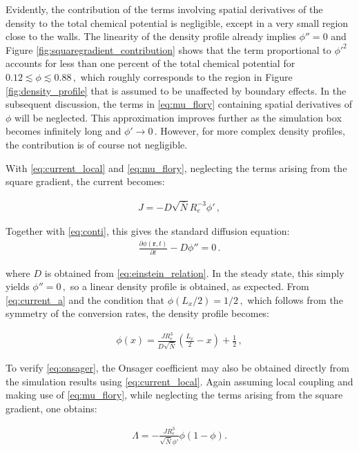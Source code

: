 \documentclass[bachelor,       %
               twoside,        %
               BCOR10mm,       %
               ngerman, english %
               ]{GAUBM}
\begin{document}
Evidently, the contribution of the terms involving spatial derivatives of the density to the total chemical potential is negligible, except in a very small region close to the walls. The linearity of the density profile already implies $\phi''=0$ and Figure \ref{fig:squaregradient_contribution} shows that the term proportional to $\phi'^2$ accounts for less than one percent of the total chemical potential for $0.12\lesssim\phi\lesssim 0.88\,,$ which roughly corresponds to the region in Figure \ref{fig:density_profile} that is assumed to be unaffected by boundary effects. In the subsequent discussion, the terms in \eqref{eq:mu_flory} containing spatial derivatives of $\phi$ will be neglected. This approximation improves further as the simulation box becomes infinitely long and $\phi'\rightarrow 0\,.$ However, for more complex density profiles, the contribution is of course not negligible.

With \eqref{eq:current_local} and \eqref{eq:mu_flory}, neglecting the terms arising from the square gradient, the current becomes:


\begin{align}
  J=-D\sqrt{\bar N}R_e^{-3}\phi'\,,
  \label{eq:current_a}
\end{align}


Together with \eqref{eq:conti}, this gives the standard diffusion equation:
\begin{align}
  \frac{\partial\phi(\mathbf r, t)}{\partial t}-D \phi''=0\,.
  \label{eq:diffusion}
\end{align}

where $D$ is obtained from \eqref{eq:einstein_relation}. In the steady state, this simply yields $\phi''=0\,,$ so a linear density profile is obtained, as expected. From \eqref{eq:current_a} and the condition that $\phi(L_x/2)=1/2\,,$ which follows from the symmetry of the conversion rates, the density profile becomes:

\begin{align}
  \phi(x)=\frac{JR_e^3}{D\sqrt{\bar{N}}}\left(\frac{L_x}{2}-x\right) + \frac{1}{2}\,,
  \label{eq:density_profile_ana}
\end{align}


To verify \eqref{eq:onsager}, the Onsager coefficient may also be obtained directly from the simulation results using \eqref{eq:current_local}. Again assuming local coupling and making use of \eqref{eq:mu_flory}, while neglecting the terms arising from the square gradient, one obtains:

\begin{align}
  \Lambda=-\frac{JR_e^3}{\sqrt{\bar N}\phi'}\phi(1-\phi).
  \label{eq:onsager_num}
\end{align}
\end{document}
